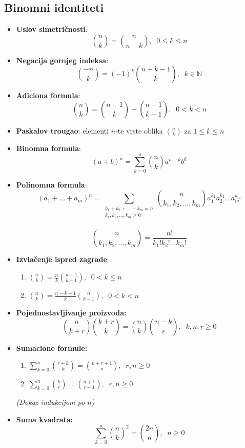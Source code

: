 \documentclass[a4paper,12pt,twoside]{report}
\numberwithin{algorithm}{section}
\begin{document}
\subsection{Binomni identiteti}
\begin{itemize}
    \item \textbf{Uslov simetričnosti}: \[ {{n}\choose k} = {{n}\choose n-k}, \;\; 0 \leq k \leq n \]
    \item \textbf{Negacija gornjeg indeksa}: \[ {{-n}\choose k} = (-1)^k {{n+k-1}\choose k}, \;\; k \in \mathbb{N}\]
    \item \textbf{Adiciona formula}: \[ {{n}\choose k} = {{n-1}\choose k} + {{n-1}\choose k-1}, \;\; 0 < k < n \]
    \item \textbf{Paskalov trougao}: elementi $n$-te vrste oblika ${{n}\choose k}$ za $1 \leq k \leq n$
    \item \textbf{Binomna formula}: \[ (a+b)^n = \sum^n_{k=0}{{n}\choose k} a^{n-k}b^k \]
   \item \textbf{Polinomna formula}: \[ (a_1 + \dots + a_m)^n = \sum_{\substack{k_1 + k_2 + \dots + k_m = n \\ k_1, k_2, \dots, k_m \geq 0}} {{n}\choose k_1, k_2, \dots, k_m} a_1^{k_1} a_2^{k_2} \dots a_m^{k_m}\]  \\
   \[ {{n}\choose k_1, k_2, \dots, k_m} = \frac{n!}{k_1! k_2! \dots k_m!} \]
   \item \textbf{Izvlačenje ispred zagrade} \begin{enumerate}
    \item $\displaystyle {{n} \choose k} = \frac{n}{k} {{n-1} \choose {k-1}}, \;\; 0 < k \leq n$
    \item $\displaystyle {{n} \choose k} = \frac{n-k+1}{k} {{n} \choose {k-1}}, \;\; 0 < k < n$
   \end{enumerate}
   \item \textbf{Pojednostavljivanje proizvoda: } \[{{n} \choose k + r} {{k + r} \choose k} = {{n} \choose k}{{n - k} \choose r},\;\; k, n, r \geq 0\]
   \item \textbf{Sumacione formule:} \begin{enumerate}
    \item $\displaystyle \sum_{k=0}^{n}{{r + k} \choose k} = {{n+r+1} \choose {n}}, \;\; r, n \geq 0$ 
    \item $\displaystyle \sum_{k=0}^{n}{{k} \choose r} = {{n+1} \choose {r+1}}, \;\; r, n \geq 0$
   \end{enumerate}
   \textit{(Dokaz indukcijom po $n$)}
   \item \textbf{Suma kvadrata:} \[ \sum_{k=0}^{n} {{n} \choose k}^2 = {{2n} \choose n},\;\; n \geq 0 \]
\end{itemize}
\end{document}
